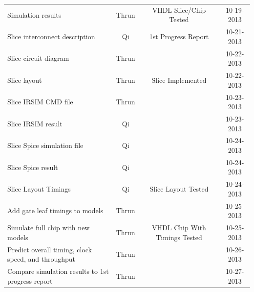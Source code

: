\documentclass{article}
\begin{document}
\begin{table}[H]
\begin{tabular}{p{}ccc}
        Simulation results                                                                                    & Thrun & VHDL Slice/Chip Tested        & 10-19-2013 \\
        Slice interconnect description                                                                        & Qi    & 1st Progress Report           & 10-21-2013 \\
        \hline
        Slice circuit diagram                                                                                 & Thrun &                               & 10-22-2013 \\
        Slice layout                                                                                          & Thrun & Slice Implemented             & 10-22-2013 \\
        Slice IRSIM CMD file                                                                                  & Thrun &                               & 10-23-2013 \\
        Slice IRSIM result                                                                                    & Qi    &                               & 10-23-2013 \\
        Slice Spice simulation file                                                                           & Qi    &                               & 10-24-2013 \\
        Slice Spice result                                                                                    & Qi    &                               & 10-24-2013 \\
        Slice Layout Timings                                                                                  & Qi    & Slice Layout Tested           & 10-24-2013 \\
        Add gate leaf timings to models                                                                       & Thrun &                               & 10-25-2013 \\
        Simulate full chip with new models                                                                    & Thrun & VHDL Chip With Timings Tested & 10-25-2013 \\
        Predict overall timing, clock speed, and throughput                                                   & Thrun &                               & 10-26-2013 \\
        Compare simulation results to 1st progress report                                                     & Thrun &                               & 10-27-2013 \\

\end{tabular}
\end{table}
\end{document}

